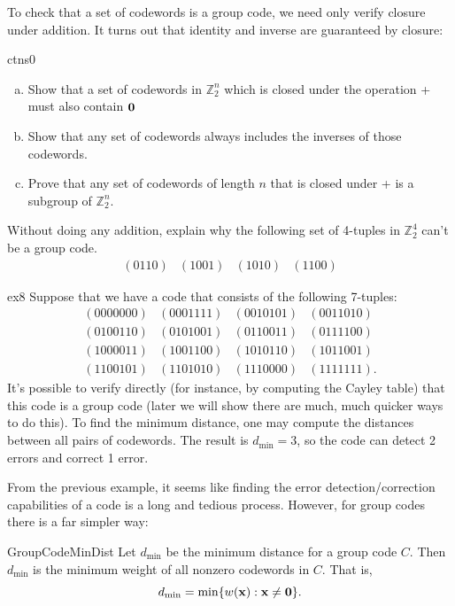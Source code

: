  To check that a set of codewords is a group code, we need only verify closure under addition. It turns out that identity and inverse are guaranteed by closure:

\begin{exercise}{ctns0}
\begin{enumerate}[(a)]
\item
Show that a set of codewords in
$\mathbb{Z}_2^n$ which is closed under the operation + must also contain ${\bold 0}$ 
\item
Show that any set of codewords always includes the inverses of those codewords.
\item
Prove that any set of codewords of length $n$ that is closed under + is a subgroup of $\mathbb{Z}_2^n$.
\end{enumerate}
\end{exercise} 
 
\begin{exercise}{}
Without doing any addition, explain why the following set of 4-tuples in
$\mathbb{Z}_2^4$ can't be a group code. 
\[
\begin{array}{cccc}
(0110) & (1001) & (1010) & (1100)
\end{array}
\]
 \end{exercise}

 
\begin{example}{ex8}
Suppose that we have a code that consists of the following 7-tuples: 
\[
\begin{array}{cccc}
(0000000) & (0001111) & (0010101) & (0011010) \\
(0100110) & (0101001) & (0110011) & (0111100) \\
(1000011) & (1001100) & (1010110) & (1011001) \\
(1100101) & (1101010) & (1110000) & (1111111).
\end{array}
\]
It's possible to verify directly (for instance, by computing the Cayley table) that this code 
is a group code (later we will show there are much, much quicker ways to do this).
To find the minimum distance, one may compute the distances
between all pairs of codewords. The result is $d_{\min} = 3$, so the code can detect 2 errors and correct 1 error.  
\end{example}
 From the previous example, it seems like finding the error detection/correction capabilities of a code is a long and tedious process. However, for group codes there is a far simpler way:
 
\begin{prop}{GroupCodeMinDist}
Let $d_{\min}$ be the minimum distance for a group code $C$. Then
$d_{\min}$ is the minimum weight of all nonzero
codewords in $C$. That is, 
\[
d_{\min} = \min\{ w({\bold x}) : { {\bold x} \neq {\bold 0}
} \}.
\]
\end{prop}
  
